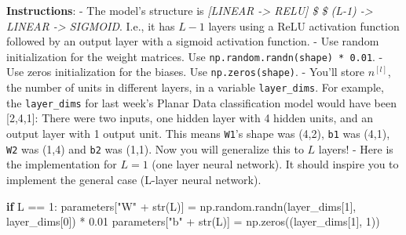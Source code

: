 \documentclass[11pt]{article}
\newenvironment{Shaded}{}{}
\newcommand{\DecValTok}[1]{\textcolor[rgb]{0.25,0.63,0.44}{{#1}}}
\newcommand{\FloatTok}[1]{\textcolor[rgb]{0.25,0.63,0.44}{{#1}}}
\newcommand{\StringTok}[1]{\textcolor[rgb]{0.25,0.44,0.63}{{#1}}}
\newcommand{\NormalTok}[1]{{#1}}
\newcommand{\ControlFlowTok}[1]{\textcolor[rgb]{0.00,0.44,0.13}{\textbf{{#1}}}}
\newcommand{\OperatorTok}[1]{\textcolor[rgb]{0.40,0.40,0.40}{{#1}}}
\newcommand{\BuiltInTok}[1]{{#1}}
\begin{document}
\textbf{Instructions}: - The model's structure is \emph{{[}LINEAR
-\textgreater{} RELU{]} \$ \times\$ (L-1) -\textgreater{} LINEAR
-\textgreater{} SIGMOID}. I.e., it has \(L-1\) layers using a ReLU
activation function followed by an output layer with a sigmoid
activation function. - Use random initialization for the weight
matrices. Use \texttt{np.random.randn(shape)\ *\ 0.01}. - Use zeros
initialization for the biases. Use \texttt{np.zeros(shape)}. - You'll
store \(n^{[l]}\), the number of units in different layers, in a
variable \texttt{layer\_dims}. For example, the \texttt{layer\_dims} for
last week's Planar Data classification model would have been
{[}2,4,1{]}: There were two inputs, one hidden layer with 4 hidden
units, and an output layer with 1 output unit. This means \texttt{W1}'s
shape was (4,2), \texttt{b1} was (4,1), \texttt{W2} was (1,4) and
\texttt{b2} was (1,1). Now you will generalize this to \(L\) layers! -
Here is the implementation for \(L=1\) (one layer neural network). It
should inspire you to implement the general case (L-layer neural
network).

\begin{Shaded}
\begin{Highlighting}[]
    \ControlFlowTok{if}\NormalTok{ L }\OperatorTok{==} \DecValTok{1}\NormalTok{:}
\NormalTok{        parameters[}\StringTok{"W"} \OperatorTok{+} \BuiltInTok{str}\NormalTok{(L)] }\OperatorTok{=}\NormalTok{ np.random.randn(layer\_dims[}\DecValTok{1}\NormalTok{], layer\_dims[}\DecValTok{0}\NormalTok{]) }\OperatorTok{*} \FloatTok{0.01}
\NormalTok{        parameters[}\StringTok{"b"} \OperatorTok{+} \BuiltInTok{str}\NormalTok{(L)] }\OperatorTok{=}\NormalTok{ np.zeros((layer\_dims[}\DecValTok{1}\NormalTok{], }\DecValTok{1}\NormalTok{))}
\end{Highlighting}
\end{Shaded}
\end{document}
